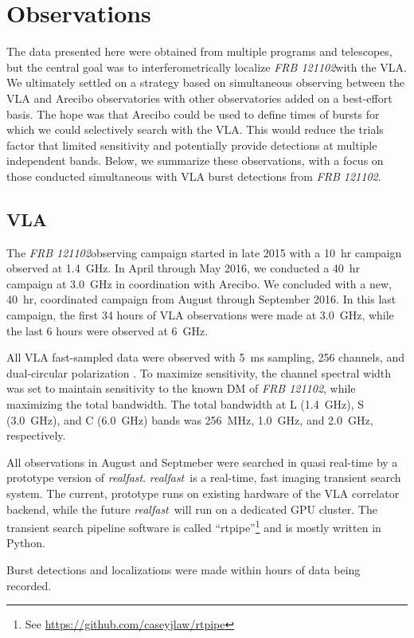 \documentclass{emulateapj}
\newcommand{\rf}{\emph{realfast}}
\newcommand{\frb}{\emph{FRB 121102}}
\begin{document}
\section{Observations}
The data presented here were obtained from multiple programs and telescopes, but the central goal was to interferometrically localize \frb with the VLA. We ultimately settled on a strategy based on simultaneous observing between the VLA and Arecibo observatories with other observatories added on a best-effort basis. The hope was that Arecibo could be used to define times of bursts for which we could selectively search with the VLA. This would reduce the trials factor that limited sensitivity and potentially provide detections at multiple independent bands. Below, we summarize these observations, with a focus on those conducted simultaneous with VLA burst detections from \frb.

\subsection{VLA}
The \frb observing campaign started in late 2015 with a 10~hr campaign observed at 1.4~GHz. In April through May 2016, we conducted a 40~hr campaign at 3.0~GHz in coordination with Arecibo. We concluded with a new, 40~hr, coordinated campaign from August through September 2016. In this last campaign, the first 34 hours of VLA observations were made at 3.0~GHz, while the last 6 hours were observed at 6~GHz.

All VLA fast-sampled data were observed with 5~ms sampling, 256 channels, and dual-circular polarization \citep[as in]{2015ApJ...807...16L}. To maximize sensitivity, the channel spectral width was set to maintain sensitivity to the known DM of \frb, while maximizing the total bandwidth. The total bandwidth at L (1.4~GHz), S (3.0~GHz), and C (6.0~GHz) bands was 256~MHz, 1.0~GHz, and 2.0~GHz, respectively.

All observations in August and Septmeber were searched in quasi real-time by a prototype version of \rf. \rf\ is a real-time, fast imaging transient search system. The current, prototype runs on existing hardware of the VLA correlator backend, while the future \rf\ will run on a dedicated GPU cluster. The transient search pipeline software is called ``rtpipe''\footnote{See \url{https://github.com/caseyjlaw/rtpipe}} and is mostly written in Python.

Burst detections and localizations were made within hours of data being recorded.
\end{document}
